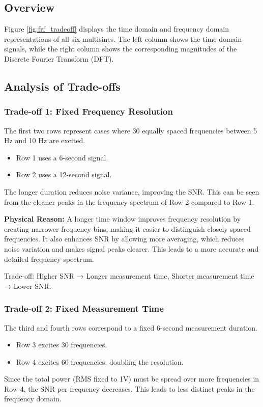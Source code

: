 \documentclass[a4paper,12pt]{article}
\begin{document}
\subsection*{Overview}
Figure \ref{fig:frf_tradeoff} displays the time domain and frequency domain representations of all six multisines. The left column shows the time-domain signals, while the right column shows the corresponding magnitudes of the Discrete Fourier Transform (DFT).

\subsection*{Analysis of Trade-offs}

\subsubsection*{Trade-off 1: Fixed Frequency Resolution}
The first two rows represent cases where 30 equally spaced frequencies between 5 Hz and 10 Hz are excited.
\begin{itemize}
    \item Row 1 uses a 6-second signal.
    \item Row 2 uses a 12-second signal.
\end{itemize}
The longer duration reduces noise variance, improving the SNR. This can be seen from the cleaner peaks in the frequency spectrum of Row 2 compared to Row 1.

\textbf{Physical Reason:} 
A longer time window improves frequency resolution by creating narrower frequency bins, making it easier to distinguish closely spaced frequencies. It also enhances SNR by allowing more averaging, which reduces noise variation and makes signal peaks clearer. This leads to a more accurate and detailed frequency spectrum.

Trade-off: Higher SNR → Longer measurement time, Shorter measurement time → Lower SNR.

\subsubsection*{Trade-off 2: Fixed Measurement Time}
The third and fourth rows correspond to a fixed 6-second measurement duration.
\begin{itemize}
    \item Row 3 excites 30 frequencies.
    \item Row 4 excites 60 frequencies, doubling the resolution.
\end{itemize}
Since the total power (RMS fixed to 1V) must be spread over more frequencies in Row 4, the SNR per frequency decreases. This leads to less distinct peaks in the frequency domain.
\end{document}
